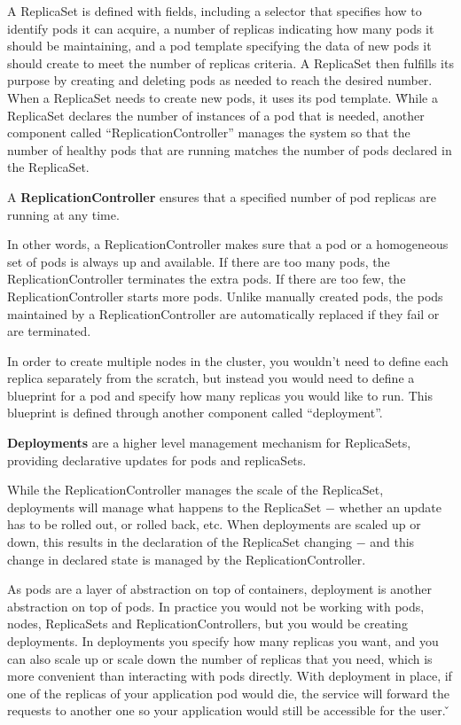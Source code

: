 A ReplicaSet is defined with fields, including a selector that specifies how to identify pods it can acquire, a
number of replicas indicating how many pods it should be maintaining, and a pod template specifying the data of new
pods it should create to meet the number of replicas criteria. A ReplicaSet then fulfills its purpose by creating and
deleting pods as needed to reach the desired number. When a ReplicaSet needs to create new pods, it uses its pod
template. \v

While a ReplicaSet declares the number of instances of a pod that is needed, another component called
``ReplicationController'' manages the system so that the number of healthy pods that are running matches the number
of pods declared in the ReplicaSet.

\bd[ReplicationController]
A \textbf{ReplicationController} ensures that a specified number of pod replicas are running at any time.
\ed

In other words, a ReplicationController makes sure that a pod or a homogeneous set of pods is always up and available.
If there are too many pods, the ReplicationController terminates the extra pods. If there are too few, the
ReplicationController starts more pods. Unlike manually created pods, the pods maintained by a ReplicationController
are automatically replaced if they fail or are terminated.


In order to create multiple nodes in the cluster, you wouldn't need to define each replica separately from the
scratch, but instead you would need to define a blueprint for a pod and specify how many replicas you would like to
run. This blueprint is defined through another component called ``deployment''.

\bd[Deployment]
\textbf{Deployments} are a higher level management mechanism for ReplicaSets, providing declarative updates for pods and
replicaSets.
\ed

While the ReplicationController manages the scale of the ReplicaSet, deployments will manage what happens to the
ReplicaSet $-$ whether an update has to be rolled out, or rolled back, etc. When deployments are scaled up or down,
this results in the declaration of the ReplicaSet changing $-$ and this change in declared state is managed by the
ReplicationController.


As pods are a layer of abstraction on top of containers, deployment is another abstraction on top of pods. In
practice you would not be working with pods, nodes, ReplicaSets and ReplicationControllers, but you would be creating
deployments. In deployments you specify how many replicas you want, and you can also scale up or scale down the
number of replicas that you need, which is more convenient than interacting with pods directly. With deployment in
place, if one of the replicas of your application pod would die, the service will forward the requests to another one
so your application would still be accessible for the user. \v

